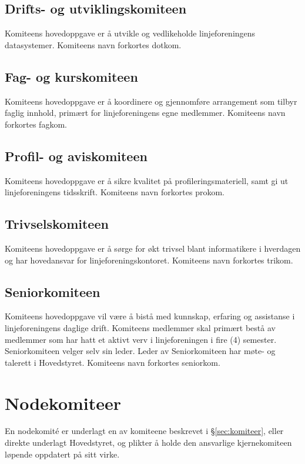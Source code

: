\vspace{-10pt}
\subsection{Drifts- og utviklingskomiteen}{
Komiteens hovedoppgave er å utvikle og vedlikeholde linjeforeningens datasystemer. Komiteens navn forkortes dotkom.

}

\vspace{-10pt}
\subsection{Fag- og kurskomiteen}{
Komiteens hovedoppgave er å koordinere og gjennomføre arrangement som tilbyr faglig innhold, primært for linjeforeningens egne medlemmer. Komiteens navn forkortes fagkom.
}

\vspace{-10pt}
\subsection{Profil- og aviskomiteen}{
Komiteens hovedoppgave er å sikre kvalitet på profileringsmateriell, samt gi ut linjeforeningens tidsskrift. Komiteens navn forkortes prokom.
}

\vspace{-10pt}
\subsection{Trivselskomiteen}{
Komiteens hovedoppgave er å sørge for økt trivsel blant informatikere i hverdagen og har hovedansvar for linjeforeningskontoret. Komiteens navn forkortes trikom.
}

\vspace{-10pt}
\subsection{Seniorkomiteen}{
Komiteens hovedoppgave vil være å bistå med kunnskap, erfaring og assistanse i linjeforeningens daglige drift. Komiteens medlemmer skal primært bestå av medlemmer som har hatt et aktivt verv i linjeforeningen i fire (4) semester. Seniorkomiteen velger selv sin leder. Leder av Seniorkomiteen har møte- og talerett i Hovedstyret. Komiteens navn forkortes seniorkom.
}

\section{Nodekomiteer}
\vspace{23pt}
En nodekomité er underlagt en av komiteene beskrevet i §\ref{sec:komiteer}, eller direkte underlagt Hovedstyret, og plikter å holde den ansvarlige kjernekomiteen løpende oppdatert på sitt virke.



